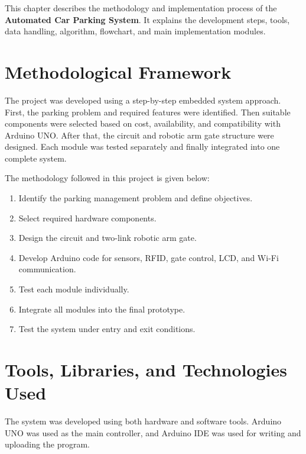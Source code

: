 
\vspace{-0.8cm}

This chapter describes the methodology and implementation process of the \textbf{Automated Car Parking System}. It explains the development steps, tools, data handling, algorithm, flowchart, and main implementation modules.

\section{Methodological Framework}

The project was developed using a step-by-step embedded system approach. First, the parking problem and required features were identified. Then suitable components were selected based on cost, availability, and compatibility with Arduino UNO. After that, the circuit and robotic arm gate structure were designed. Each module was tested separately and finally integrated into one complete system.

The methodology followed in this project is given below:

\begin{enumerate}
    \item Identify the parking management problem and define objectives.
    \item Select required hardware components.
    \item Design the circuit and two-link robotic arm gate.
    \item Develop Arduino code for sensors, RFID, gate control, LCD, and Wi-Fi communication.
    \item Test each module individually.
    \item Integrate all modules into the final prototype.
    \item Test the system under entry and exit conditions.
\end{enumerate}

\section{Tools, Libraries, and Technologies Used}

The system was developed using both hardware and software tools. Arduino UNO was used as the main controller, and Arduino IDE was used for writing and uploading the program.


